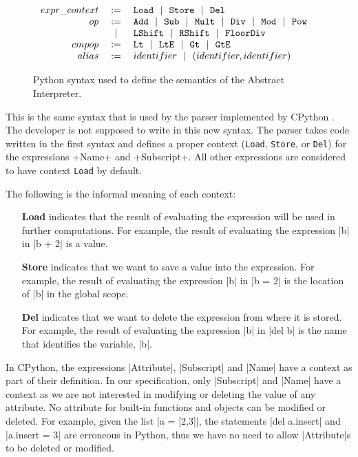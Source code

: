 \begin{figure}
\[\begin{array}{rclr}
  expr\_context &:=& \texttt{Load} ~~|~~ \texttt{Store} ~~|~~ \texttt{Del}  & \\

  op &:=& \texttt{Add} ~~|~~ \texttt{Sub} ~~|~~ \texttt{Mult} ~~|~~ \texttt{Div} ~~|~~
         \texttt{Mod} ~~|~~ \texttt{Pow} \\
     &~~|~~& \texttt{LShift} ~~|~~ \texttt{RShift} ~~|~~ \texttt{FloorDiv}  & \\
  cmpop &:=& \texttt{Lt} ~~|~~ \texttt{LtE} ~~|~~ \texttt{Gt} ~~|~~ \texttt{GtE}  & \\

  alias &:=& identifier ~~|~~ (identifier, identifier) & \\

\end{array}\]
\caption{Python syntax used to define the semantics of the Abstract Interpreter.\label{syntaxPython2}}
\end{figure}

This is the same syntax that is used by the parser implemented by CPython
\autocite{van2007python}. The developer is not supposed to write in this new syntax. The
parser takes code written in the first syntax and defines a proper context (\verb|Load|,
\verb|Store|, or \verb|Del|) for the expressions \pycode+Name+ and \pycode+Subscript+. All
other expressions are considered to have context \verb|Load| by default.

The following is the informal meaning of each context:

\begin{itemize}
\tightlist
\item[\textbf{Load}] indicates that the result of evaluating the expression will be used
  in further computations. For example, the result of evaluating the expression \pycode|b|
  in \pycode|b + 2| is a value.
\item[\textbf{Store}] indicates that we want to save a value into the expression. For
  example, the result of evaluating the expression \pycode|b| in \pycode|b = 2| is the
  location of \pycode|b| in the global scope.
\item[\textbf{Del}] indicates that we want to delete the expression from where it is stored.
  For example, the result of evaluating the expression \pycode|b| in \pycode|del b| is the
  name that identifies the variable, \pycode|b|.
\end{itemize}

In CPython, the expressions \pycode|Attribute|, \pycode|Subscript| and \pycode|Name| have a
context as part of their definition. In our specification, only \pycode|Subscript| and
\pycode|Name| have a context as we are not interested in modifying or deleting the value
of any attribute. No attribute for built-in functions and objects can be modified or
deleted. For example, given the list \pycode|a = [2,3]|, the statements
\pycode|del a.insert| and \pycode|a.insert = 3| are erroneous in Python, thus we have no
need to allow \pycode|Attribute|s to be deleted or modified.

